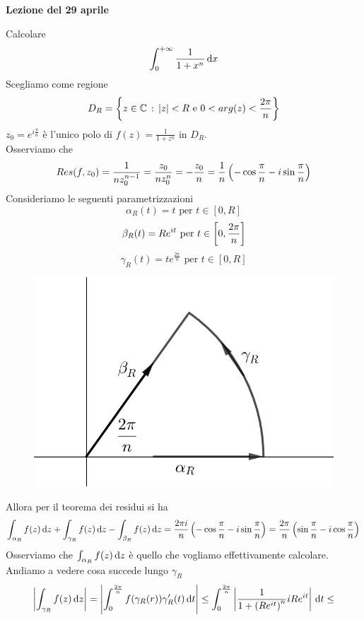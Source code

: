 

\textbf{Lezione del 29 aprile}
\begin{ese}Calcolare 
$$\int_0^{+\infty} \frac{1}{1+x^n}\, \mathrm{d}x$$ 
Scegliamo come regione 
$$ D_R =\left\{  z\in \mathbb{C} \, : \, \left\vert z \right\vert < R \text{  e } 0<arg(z) < \frac{2\pi}{n} \right\}$$ 
$z_0=e^{i\frac{\pi}{n}}$ \`e l'unico polo di $f(z) = \frac{1}{1+z^n}$ in $D_R$.\\
Osserviamo che 
$$Res(f,z_0) = \frac{1}{nz_0^{n-1}} =\frac{z_0}{nz_0^n} =-\frac{z_0}{n} = \frac{1}{n} \left( -\cos \frac{\pi}{n}-i\sin \frac{\pi}{n} \right)$$
Consideriamo le seguenti parametrizzazioni
$$ \alpha_R(t)  =t \text{ per } t\in [0, R]$$
$$ \beta_R(t)  =Re^{it} \text{ per } t\in \left[ 0, \frac{2\pi}{n} \right]$$
$$ \gamma_R(t)  =te^{\frac{2\pi}{n}} \text{ per } t\in [0, R]$$
\begin{figure}[!h]
\centering
\includegraphics[scale=0.5]{Figure/04_29}
\end{figure}
Allora per il teorema dei residui si ha 
$$ \int_{\alpha_R} f(z) \, \mathrm{d}z + \int_{\gamma_R} f(z) \, \mathrm{d}z - \int_{\beta_R} f(z) \, \mathrm{d}z = \frac{2\pi i}{n}\left( -\cos \frac{\pi}{n}-i\sin\frac{\pi}{n}  \right) =\frac{2\pi}{n}\left( \sin \frac{\pi}{n}-i\cos\frac{\pi}{n} \right) $$
Osserviamo che $\int_{\alpha_R} f(z) \, \mathrm{d}z$ \`e quello che vogliamo effettivamente calcolare.\\
Andiamo a vedere cosa succede lungo $\gamma_R$
\begin{equation}
\label{fattogenerale}
\begin{split}
\abs{\int_{\gamma_R} f(z) \dz }=\abs{\int_0^{\frac{2\pi}{n}} f(\gamma_R(r)) \gamma'_R(t) \dt }  \leq \int_0^{\frac{2\pi}{n}} \abs{\frac{1}{1+\tonde{Re^{it}}^n} iRe^{it}} \dt \leq\\

\end{split}
\end{equation}
\end{ese}
